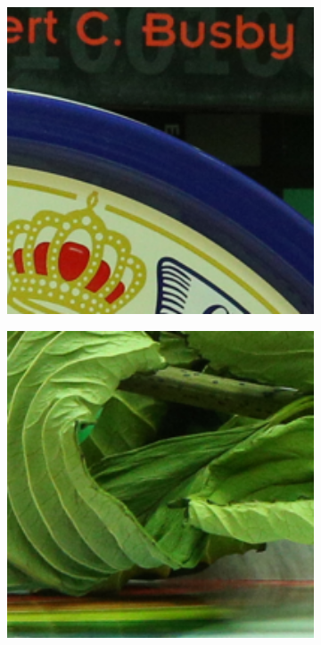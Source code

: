 \begin{figure}
    \centering
    \begin{subfigure}[t]{0.19\textwidth}
        \centering
        \includegraphics[width=1\textwidth]{images/mcwnnm/resize_5dmark3_iso3200_1_real.png}
    \end{subfigure}
    \hfill
    \begin{subfigure}[t]{0.19\textwidth}
        \centering
        \includegraphics[width=1\textwidth]{images/mcwnnm/resize_5dmark3_iso3200_2_real.png}

\end{subfigure}
\end{figure}
